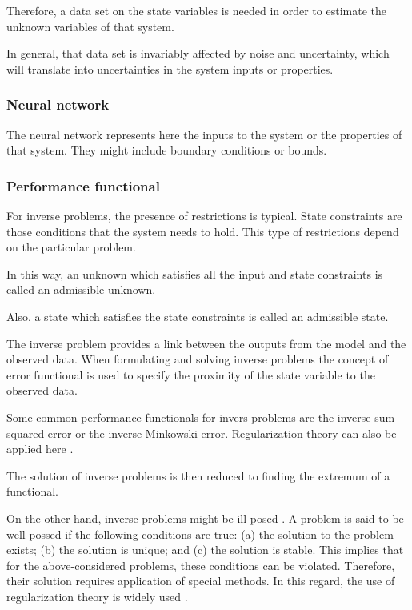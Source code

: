 Therefore, a data set on the state variables is
needed in order to estimate the unknown variables of that system.

In general, that data set is invariably affected by noise and
uncertainty, which will translate into uncertainties in the system
inputs or properties.

\subsubsection*{Neural network}

The neural network represents here the inputs to the system or the properties of that system. 
They might include boundary conditions or bounds. 

\subsubsection*{Performance functional}

For inverse problems, the presence of restrictions is typical. 
State constraints are those conditions that the system needs to
hold. This type of restrictions depend on the particular problem.

In this way, an unknown which satisfies all the input and state
constraints is called an admissible unknown.


Also, a state which satisfies the state constraints is called an
admissible state.

The inverse problem provides a link between the outputs from the
model and the observed data. When formulating and solving inverse
problems the concept of error functional is used to specify the
proximity of the state variable to the
observed data.


Some common performance functionals for invers problems are the inverse sum squared
error or the inverse Minkowski error. Regularization
theory can also be applied here
\cite{Bucur2005}.

The solution of inverse problems is then reduced to finding the
extremum of a functional.

On the other hand, inverse problems might be ill-posed
\cite{Tikhonov1977}. A problem is said to be
well possed if the following conditions are true: (a) the solution to the problem exists;
(b) the solution is unique; and (c) the solution
is stable. This implies that for the
above-considered problems, these conditions can be violated.
Therefore, their solution requires application of special methods.
In this regard, the use of regularization theory is widely used
\cite{Engl2000}.

